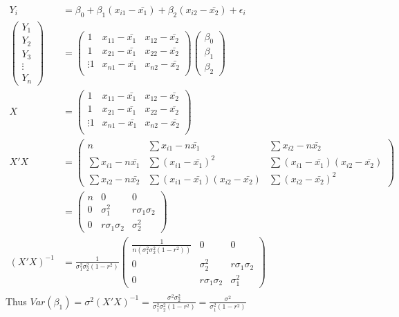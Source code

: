 \documentclass[a4paper]{article}
\begin{document}
\begin{align*}
Y_i &= \beta_0+\beta_1(x_{i1}-\bar{x_1}) + \beta_2(x_{i2}-\bar{x_2})+\epsilon_i\\
\begin{pmatrix}Y_1\\Y_2\\Y_3\\\vdots\\Y_n
\end{pmatrix}&= \begin{pmatrix} 1 & x_{11}-\bar{x_1} & x_{12}-\bar{x_2}\\
 1 & x_{21}-\bar{x_1} & x_{22}-\bar{x_2}\\
 \vdots 
 1 & x_{n1}-\bar{x_1} & x_{n2}-\bar{x_2}\\
\end{pmatrix}\begin{pmatrix}
\beta_0\\\beta_1\\\beta_2
\end{pmatrix}\\
X &= \begin{pmatrix} 1 & x_{11}-\bar{x_1} & x_{12}-\bar{x_2}\\
 1 & x_{21}-\bar{x_1} & x_{22}-\bar{x_2}\\
 \vdots 
 1 & x_{n1}-\bar{x_1} & x_{n2}-\bar{x_2}\\
\end{pmatrix}\\
X'X &= \begin{pmatrix}
n & \sum x_{i1}-n\bar{x_1} & \sum x_{i2} - n \bar{x_2}\\
\sum x_{i1}-n\bar{x_1} & \sum(x_{i1}-\bar{x_1})^2 & \sum (x_{i1}-\bar{x_1})(x_{i2}-\bar{x_2})\\
\sum x_{i2}-n\bar{x_2} & \sum (x_{i1}-\bar{x_1})(x_{i2}-\bar{x_2}) & \sum(x_{i2}-\bar{x_2})^2
\end{pmatrix}\\
& = \begin{pmatrix}
n & 0 & 0\\
0 & \sigma^2_{1} & r\sigma_1\sigma_2\\
0 & r\sigma_1\sigma_2 & \sigma_2^2
\end{pmatrix}\\ 
(X'X)^{-1} & = \frac{1}{\sigma_1^2\sigma_2^2(1-r^2)} \begin{pmatrix}
\frac{1}{n(\sigma_1^2\sigma_2^2(1-r^2))} & 0 & 0\\
0 & \sigma^2_{2} & r\sigma_1\sigma_2\\
0 & r\sigma_1\sigma_2 & \sigma_1^2
\end{pmatrix}\\ 
\end{align*}
Thus $Var(\beta_1) = \sigma^2 (X'X)^{-1} = \frac{\sigma^2 \sigma_2^2}{\sigma_1^2\sigma_2^2(1-r^2)} = \frac{\sigma^2}{\sigma_1^2(1-r^2)}$
\end{document}
